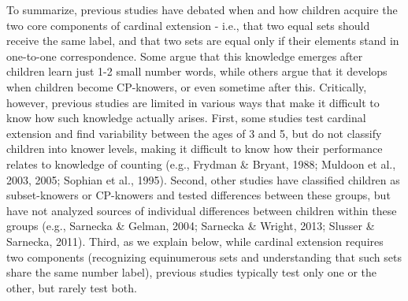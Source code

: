 \documentclass[
  man,floatsintext]{apa7}
\begin{document}
To summarize, previous studies have debated when and how children acquire the two core components of cardinal extension - i.e., that two equal sets should receive the same label, and that two sets are equal only if their elements stand in one-to-one correspondence. Some argue that this knowledge emerges after children learn just 1-2 small number words, while others argue that it develops when children become CP-knowers, or even sometime after this. Critically, however, previous studies are limited in various ways that make it difficult to know how such knowledge actually arises. First, some studies test cardinal extension and find variability between the ages of 3 and 5, but do not classify children into knower levels, making it difficult to know how their performance relates to knowledge of counting (e.g., Frydman \& Bryant, 1988; Muldoon et al., 2003, 2005; Sophian et al., 1995). Second, other studies have classified children as subset-knowers or CP-knowers and tested differences between these groups, but have not analyzed sources of individual differences between children within these groups (e.g., Sarnecka \& Gelman, 2004; Sarnecka \& Wright, 2013; Slusser \& Sarnecka, 2011). Third, as we explain below, while cardinal extension requires two components (recognizing equinumerous sets and understanding that such sets share the same number label), previous studies typically test only one or the other, but rarely test both.
\end{document}
